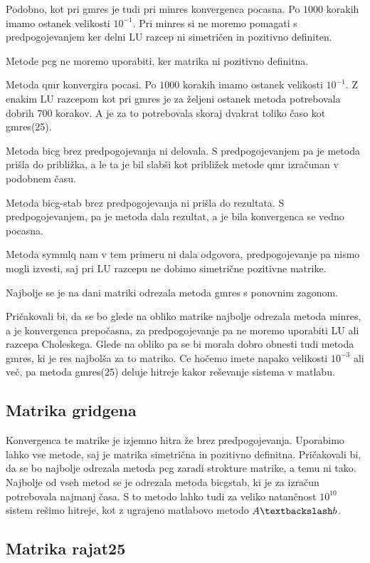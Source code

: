 \documentclass[11pt]{article} %
\begin{document}
 Podobno, kot pri gmres je tudi pri minres konvergenca pocasna. Po $1000$ korakih imamo ostanek velikosti $10^{-1}$. Pri minres si ne moremo pomagati s predpogojevanjem ker delni LU razcep ni  simetričen in pozitivno definiten.
 
 Metode pcg ne moremo uporabiti, ker matrika ni pozitivno definitna.
 
 Metoda qmr konvergira pocasi.  Po $1000$ korakih imamo ostanek velikosti $10^{-1}$. Z enakim LU razcepom kot pri gmres je za željeni ostanek metoda potrebovala dobrih 700 korakov. A je za to potrebovala skoraj dvakrat toliko časo kot gmres(25).
 
 Metoda bicg brez predpogojevanja ni delovala. S predpogojevanjem pa je metoda prišla do približka, a le ta je bil slabši kot približek metode qmr izračunan v podobnem času.
 
Metoda bicg-stab brez predpogojevanja ni prišla do rezultata. S predpogojevanjem, pa je metoda dala rezultat, a je bila konvergenca se vedno pocasna.

Metoda symmlq nam v tem primeru ni dala odgovora, predpogojevanje pa nismo mogli izvesti, saj pri LU razcepu ne dobimo simetrične pozitivne matrike.

Najbolje se je na dani matriki odrezala metoda gmres s ponovnim zagonom.

Pričakovali bi, da se bo glede na obliko matrike najbolje odrezala metoda minres, a je konvergenca prepočasna, za predpogojevanje pa ne moremo uporabiti LU ali razcepa Choleskega. Glede na obliko pa se bi morala dobro obnesti tudi metoda gmres, ki je res najbolša za to matriko. Ce hočemo imete napako velikosti $10^{-3}$ ali več, pa metoda gmres(25) deluje hitreje kakor reševanje sistema v matlabu.

\subsection{Matrika gridgena}

Konvergenca te matrike je izjemno hitra že brez predpogojevanja. Uporabimo lahko vse metode, saj je matrika simetrična in pozitivno definitna. Pričakovali bi, da se bo najbolje odrezala metoda pcg zaradi strokture matrike, a temu ni tako. Najbolje od vseh metod se je odrezala metoda bicgstab, ki je za izračun potrebovala najmanj časa. S to metodo lahko tudi za veliko natančnost $10^{10}$ sistem rešimo hitreje, kot z ugrajeno matlabovo metodo $A\textbackslash b$.

\subsection{Matrika rajat25}
\end{document}
